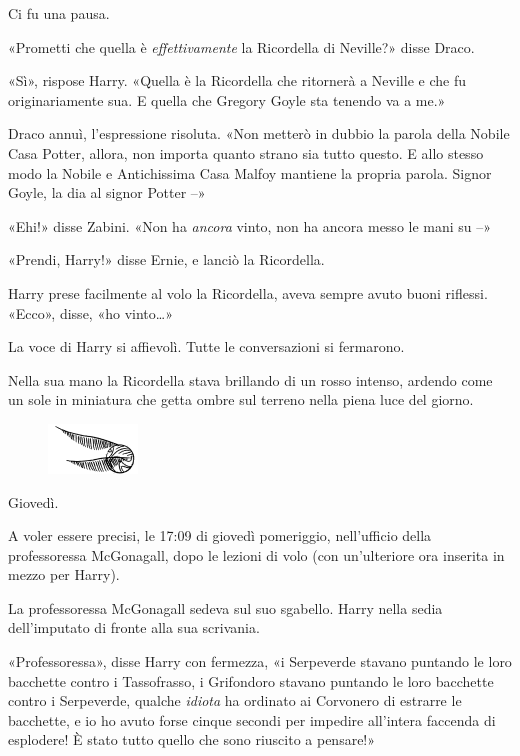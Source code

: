 Ci fu una pausa.

«Prometti che quella è \textit{effettivamente} la Ricordella di Neville?» disse Draco.

«Sì», rispose Harry. «Quella è la Ricordella che ritornerà a Neville e che fu originariamente sua. E quella che Gregory Goyle sta tenendo va a me.»

Draco annuì, l’espressione risoluta. «Non metterò in dubbio la parola della Nobile Casa Potter, allora, non importa quanto strano sia tutto questo. E allo stesso modo la Nobile e Antichissima Casa Malfoy mantiene la propria parola. Signor Goyle, la dia al signor Potter –»

«Ehi!» disse Zabini. «Non ha \textit{ancora} vinto, non ha ancora messo le mani su –»

«Prendi, Harry!» disse Ernie, e lanciò la Ricordella.

Harry prese facilmente al volo la Ricordella, aveva sempre avuto buoni riflessi. «Ecco», disse, «ho vinto…»

La voce di Harry si affievolì. Tutte le conversazioni si fermarono.

Nella sua mano la Ricordella stava brillando di un rosso intenso, ardendo come un sole in miniatura che getta ombre sul terreno nella piena luce del giorno.

\begin{figure}[h!]
        \includegraphics[scale=0.4]{boccino.png}
        \centering
\end{figure}

Giovedì.

A voler essere precisi, le 17:09 di giovedì pomeriggio, nell’ufficio della professoressa McGonagall, dopo le lezioni di volo (con un’ulteriore ora inserita in mezzo per Harry).

La professoressa McGonagall sedeva sul suo sgabello. Harry nella sedia dell’imputato di fronte alla sua scrivania.

«Professoressa», disse Harry con fermezza, «i Serpeverde stavano puntando le loro bacchette contro i Tassofrasso, i Grifondoro stavano puntando le loro bacchette contro i Serpeverde, qualche \textit{idiota} ha ordinato ai Corvonero di estrarre le bacchette, e io ho avuto forse cinque secondi per impedire all’intera faccenda di esplodere! È stato tutto quello che sono riuscito a pensare!»


